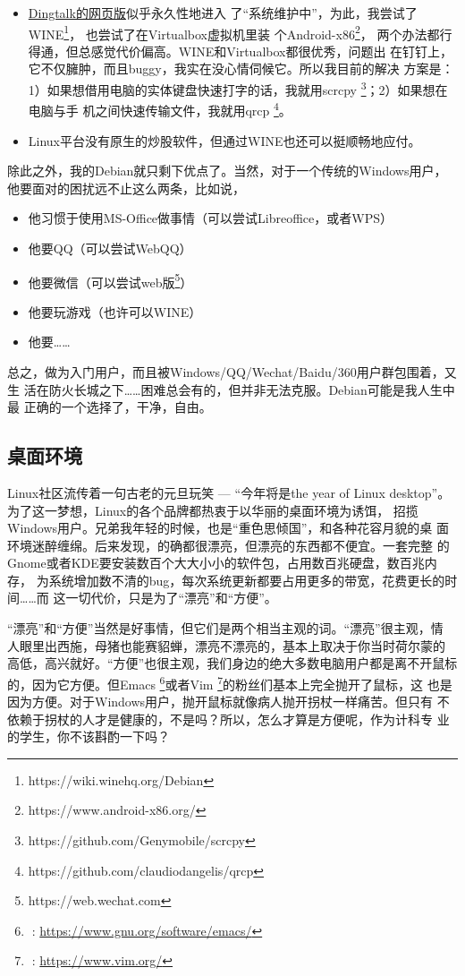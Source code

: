 \begin{itemize}
\item \href{https://im.dingtalk.com}{Dingtalk的网页版}似乎永久性地进入
  了“系统维护中”，为此，我尝试了WINE\footnote{https://wiki.winehq.org/Debian}，%
  也尝试了在Virtualbox虚拟机里装
  个Android-x86\footnote{https://www.android-x86.org/}，%
  两个办法都行得通，但总感觉代价偏高。WINE和Virtualbox都很优秀，问题出
  在钉钉上，它不仅臃肿，而且buggy，我实在没心情伺候它。所以我目前的解决
  方案是：1）如果想借用电脑的实体键盘快速打字的话，我就用scrcpy%
  \footnote{https://github.com/Genymobile/scrcpy}；2）如果想在电脑与手
  机之间快速传输文件，我就用qrcp%
  \footnote{https://github.com/claudiodangelis/qrcp}。
\item Linux平台没有原生的炒股软件，但通过WINE也还可以挺顺畅地应付。
\end{itemize}

除此之外，我的Debian就只剩下优点了。当然，对于一个传统的Windows用户，
他要面对的困扰远不止这么两条，比如说，

\begin{itemize}
\item 他习惯于使用MS-Office做事情（可以尝试Libreoffice，或者WPS）
\item 他要QQ（可以尝试WebQQ）
\item 他要微信（可以尝试web版\footnote{https://web.wechat.com}）
\item 他要玩游戏（也许可以WINE）
\item 他要……
\end{itemize}

总之，做为入门用户，而且被Windows/QQ/Wechat/Baidu/360用户群包围着，又生
活在防火长城之下……困难总会有的，但并非无法克服。Debian可能是我人生中最
正确的一个选择了，干净，自由。

\subsection{桌面环境}

Linux社区流传着一句古老的元旦玩笑 --- “今年将是the year of Linux
desktop”。为了这一梦想，Linux的各个品牌都热衷于以华丽的桌面环境为诱饵，
招揽Windows用户。兄弟我年轻的时候，也是“重色思倾国”，和各种花容月貌的桌
面环境迷醉缠绵。后来发现，的确都很漂亮，但漂亮的东西都不便宜。一套完整
的Gnome或者KDE要安装数百个大大小小的软件包，占用数百兆硬盘，数百兆内存，
为系统增加数不清的bug，每次系统更新都要占用更多的带宽，花费更长的时间……而
这一切代价，只是为了“漂亮”和“方便”。

“漂亮”和“方便”当然是好事情，但它们是两个相当主观的词。“漂亮”很主观，情
人眼里出西施，母猪也能赛貂蝉，漂亮不漂亮的，基本上取决于你当时荷尔蒙的
高低，高兴就好。“方便”也很主观，我们身边的绝大多数电脑用户都是离不开鼠标的，因为它方便。但Emacs%
\footnote{: \url{https://www.gnu.org/software/emacs/}}或者Vim%
\footnote{: \url{https://www.vim.org/}}的粉丝们基本上完全抛开了鼠标，这
也是因为方便。对于Windows用户，抛开鼠标就像病人抛开拐杖一样痛苦。但只有
不依赖于拐杖的人才是健康的，不是吗？所以，怎么才算是方便呢，作为计科专
业的学生，你不该斟酌一下吗？

